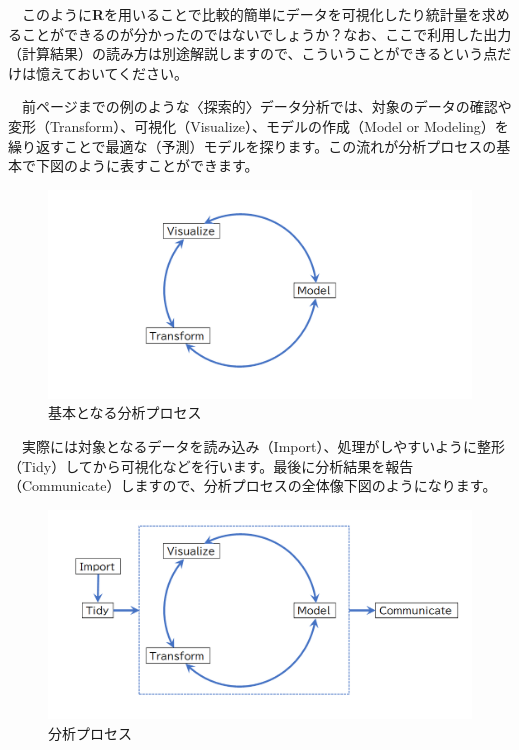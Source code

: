 \documentclass[
  12pt,
]{book}
\begin{document}
　このように\textbf{R}を用いることで比較的簡単にデータを可視化したり統計量を求めることができるのが分かったのではないでしょうか？なお、ここで利用した出力（計算結果）の読み方は別途解説しますので、こういうことができるという点だけは憶えておいてください。

\newpage

　前ページまでの例のような〈探索的〉データ分析では、対象のデータの確認や変形（Transform）、可視化（Visualize）、モデルの作成（Model or Modeling）を繰り返すことで最適な（予測）モデルを探ります。この流れが分析プロセスの基本で下図のように表すことができます。

\begin{figure}[H]

{\centering \includegraphics[width=0.9\linewidth,]{./fig/DSWF/data_science_workflow_step1} 

}

\caption{基本となる分析プロセス}\label{fig:unnamed-chunk-9}
\end{figure}

　実際には対象となるデータを読み込み（Import）、処理がしやすいように整形（Tidy）してから可視化などを行います。最後に分析結果を報告（Communicate）しますので、分析プロセスの全体像下図のようになります。

\begin{figure}[H]

{\centering \includegraphics[width=0.9\linewidth,]{./fig/DSWF/data_science_workflow_step2} 

}

\caption{分析プロセス}\label{fig:unnamed-chunk-10}
\end{figure}
\end{document}
